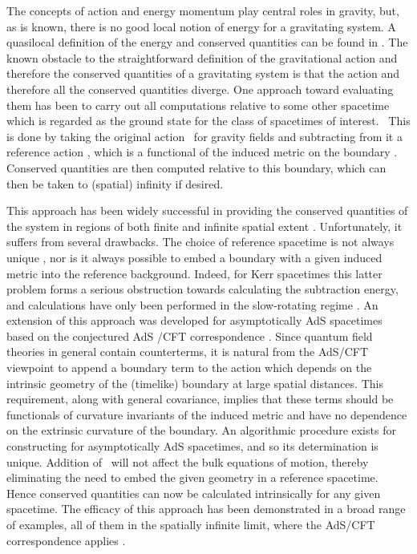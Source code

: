 \documentclass[a4paper,12pt,onecolumn]{revtex4}
\begin{document}
The concepts of action and energy momentum play central roles in
gravity, but, as is known, there is no good local notion of energy
for a gravitating system. A quasilocal definition of the energy
and conserved quantities can be found in \cite{BY}. The known
obstacle to the straightforward definition of the gravitational
action and therefore the conserved quantities of a gravitating
system is that the action and therefore all the conserved
quantities diverge. One approach toward evaluating them has been
to carry out all computations relative to some other spacetime
which is regarded as the ground state for the class of spacetimes
of interest. \ This is done by taking the original action
\coordHE{}\ for gravity fields and subtracting from it a
reference action \coordHE{}, which is a functional of the induced
metric \myHighlight{$\gamma $}\coordHE{} on the boundary \coordHE{}. Conserved
quantities are then computed relative to this boundary, which can
then be taken to (spatial) infinity if desired.

 This approach has been widely successful in providing the
conserved quantities of the system in regions of both finite and
infinite spatial extent \cite{BY,BCM}. Unfortunately, it suffers
from several drawbacks. The choice of reference spacetime is not
always unique \cite{CCM}, nor is it always possible to embed a
boundary with a given induced metric into the reference
background. Indeed, for Kerr spacetimes this latter problem forms
a serious obstruction towards calculating the subtraction energy,
and calculations have only been performed in the slow-rotating
regime \cite {Martinez}. An extension of this approach was
developed for asymptotically AdS spacetimes based on the
conjectured AdS /CFT correspondence
\cite{hensken,hyun,balakraus,Deh1}. Since quantum field theories
in general contain counterterms, it is natural from the AdS/CFT
viewpoint to append a boundary term \coordHE{} to the action which
depends on the intrinsic geometry of the (timelike) boundary at
large spatial distances. This requirement, along with general
covariance, implies that these terms should be functionals of
curvature invariants of the induced metric and have no dependence
on the extrinsic curvature of the boundary. An algorithmic
procedure \cite{kls} exists for constructing \coordHE{} for
asymptotically AdS spacetimes, and so its determination is unique.
Addition of \coordHE{}\ will not affect the bulk equations of
motion, thereby eliminating the need to embed the given geometry
in a reference spacetime. Hence conserved quantities can now be
calculated intrinsically for any given spacetime. The efficacy of
this approach has been demonstrated in a broad range of examples,
all of them in the spatially infinite limit, where the AdS/CFT
correspondence applies \cite{nutent,EJM,nutkerr,dasman,Awad,vish}.
\end{document}
